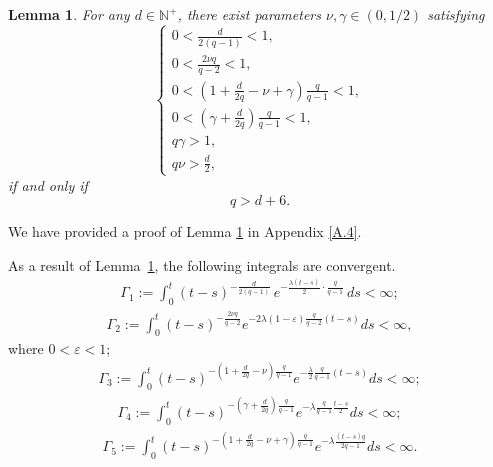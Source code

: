 \documentclass[10pt]{article}
\numberwithin{figure}{section}
\numberwithin{equation}{section}
\newtheorem{lemma}[theorem]{Lemma}
\newcommand{\0}{{\theta}}
\def\lam{\lambda}
\def\ve{\varepsilon}
\def\gam{\gamma}
\def\a{\alpha}
\def\~{\tilde}
\def\8{\infty}
\def\Hs{\hspace{1cm}}\def\hs{\hspace{0.5cm}}
\def\Vs{\vskip8pt}\def\vs{\vskip4pt}
\def\[{\left[}\def\]{\right]}
\begin{document}
\begin{lemma}\label{le4.3}
For any $d\in\mathbb N^+$, there exist parameters $\nu,\gamma\in(0,1/2)$ satisfying
$$
\begin{cases}
0<\frac{d}{2(q-1)}<1,\\[0.3em]
0<\frac{2\nu q}{q-2}<1,\\[0.3em]
0<\left(1+\frac{d}{2q}-\nu+\gam\right)\frac{q}{q-1}<1,\\[0.3em]
0<(\gamma+\frac{d}{2q})\frac{q}{q-1}<1,\\[0.3em]
q\gamma>1,\\[0.3em]
q\nu>\frac{d}{2},
\end{cases}
$$
if and only if $$q>d+6.$$ %
\end{lemma}
We have provided a proof of Lemma \ref{le4.3} in Appendix \ref{A.4}.
\Vs



As a result of Lemma~\ref{le4.3}, the following integrals are convergent.
\begin{align*}
\Gamma_1:=\int_0^{t} (t - s)^{-\frac{d}{2(q-1)}} \,
        e^{-\frac{\lambda (t - s)}{2} \cdot \frac{q}{q-1}} \, ds<\8;
\end{align*}
\begin{align*}
\Gamma_2:=\int_0^t(t-s)^{-\frac{2\nu q}{q-2}}e^{-2\lambda(1-\ve)\frac{q}{q-2}(t-s)}ds<\8,
\end{align*}where $0<\ve<1$;
\begin{align*}\Gamma_3:=\int_0^{t}(t-s)^{-(1+\frac{d}{2q}-\nu)\frac{q}{q-1}}e^{-\frac{\lam}{2}\frac{q}{q-1}(t-s)}ds<\8;
\end{align*}
\begin{align*}
\Gamma_4:=\int_0^t(t-s)^{-(\gamma+\frac{d}{2q})\frac{q}{q-1}}e^{-\lambda\frac{q}{q-1}\frac{t-s}{2}}ds
              <\8;
\end{align*}
\begin{align*}
\Gamma_5:=\int_0^t(t-s)^{-(1+\frac{d}{2q}-\nu+\gam)\frac{q}{q-1}}e^{-\lam\frac{(t-s)q}{2{q-1}}}ds<\8.
\end{align*}
\end{document}
